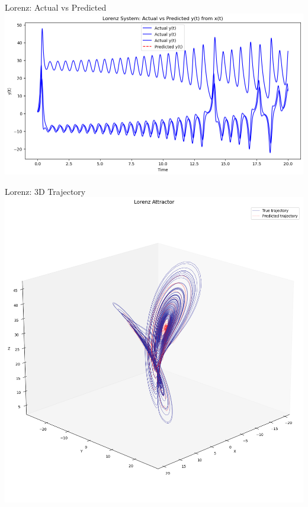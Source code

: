 \documentclass{beamer}
\begin{document}
\begin{frame}{Lorenz: Actual vs Predicted}
  \includegraphics[width=1\linewidth]{figures/lorentz_pendulum_1.png}
\end{frame}

\begin{frame}{Lorenz: 3D Trajectory}
  \includegraphics[width=1\linewidth]{figures/lorentz_pendulum_2.png}
\end{frame}
\end{document}
